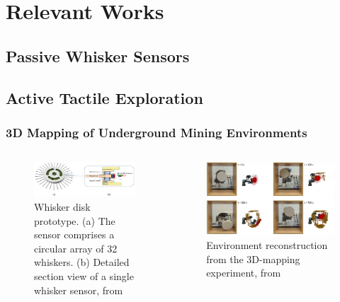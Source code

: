 

\chapter{Relevant Works}

\section{Passive Whisker Sensors}

\section{Active Tactile Exploration}

\subsection{3D Mapping of Underground Mining Environments}
\begin{columns}[T,onlytextwidth]
    \begin{column}[T]{0.48\textwidth}
        \begin{figure}[H]
            \centering
            \includegraphics[width=\textwidth]{figures/related-works-1-prototype}
            \caption{Whisker disk prototype. (a) The sensor comprises a circular array of 32 whiskers. (b) Detailed section view of a single whisker sensor, from~\cite{biomimetics9020083}}
        \end{figure}
    \end{column}
    \begin{column}[T]{0.48\textwidth}
        \begin{figure}[H]
            \centering
            \includegraphics[width=\textwidth]{figures/related-works-1-results}
            \caption{Environment reconstruction from the 3D-mapping experiment, from ~\cite{biomimetics9020083}}
        \end{figure}
    \end{column}
\end{columns}

